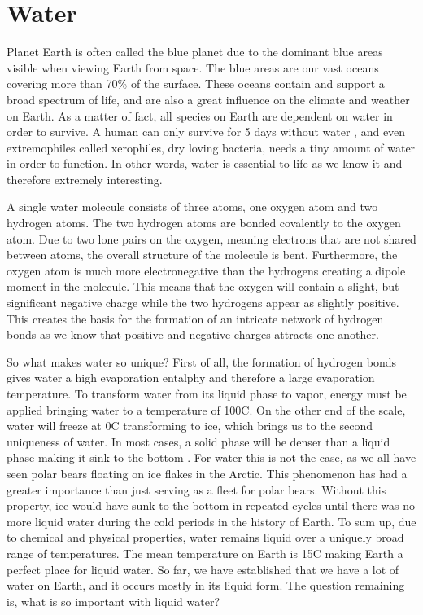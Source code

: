 \section{Water}
Planet Earth is often called the blue planet due to the dominant blue areas visible when viewing Earth from space.
The blue areas are our vast oceans covering more than 70\% \cite{WikiEarth} of the surface.
These oceans contain and support a broad spectrum of life, and are also a great influence on the climate and weather on Earth.
As a matter of fact, all species on Earth are dependent on water in order to survive.
A human can only survive for 5 days without water \cite{SurviveWater}, and even extremophiles called xerophiles, dry loving bacteria, needs a tiny amount of water in order to function.
In other words, water is essential to life as we know it and therefore extremely interesting. 

A single water molecule consists of three atoms, one oxygen atom and two hydrogen atoms.
The two hydrogen atoms are bonded covalently to the oxygen atom.
Due to two lone pairs on the oxygen, meaning electrons that are not shared between atoms, the overall structure of the molecule is bent.
Furthermore, the oxygen atom is much more electronegative than the hydrogens creating a dipole moment in the molecule.
This means that the oxygen will contain a slight, but significant negative charge while the two hydrogens appear as slightly positive.
This creates the basis for the formation of an intricate network of hydrogen bonds as we know that positive and negative charges attracts one another.  

So what makes water so unique?
First of all, the formation of hydrogen bonds gives water a high evaporation entalphy and therefore a large evaporation temperature.
To transform water from its liquid phase to vapor, energy must be applied bringing water to a temperature of 100\degree C.
On the other end of the scale, water will freeze at 0\degree C transforming to ice, which brings us to the second uniqueness of water.
In most cases, a solid phase will be denser than a liquid phase making it sink to the bottom \cite{SolidWater}.
For water this is not the case, as we all have seen polar bears floating on ice flakes in the Arctic.
This phenomenon has had a greater importance than just serving as a fleet for polar bears.
Without this property, ice would have sunk to the bottom in repeated cycles until there was no more liquid water during the cold periods in the history of Earth.
To sum up, due to chemical and physical properties, water remains liquid over a uniquely broad range of temperatures.
The mean temperature on Earth is 15\degree C \cite{WikiEarth} making Earth a perfect place for liquid water.
So far, we have established that we have a lot of water on Earth, and it occurs mostly in its liquid form.
The question remaining is, what is so important with liquid water? 

